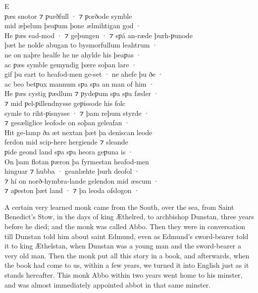\documentclass[10pt]{book}
\begin{document}
\begin{center}
\parbox{9.29cm}{
\lettrine[lines=4]{\color{BrickRed}E}{} \\
ƿ\ae{}s snotor ⁊ ƿurðfull · ⁊ ƿorðode symble\\
mid \ae{}þelum þeaƿum þone \ae{}lmihtigan god · \\
He ƿ\ae{}s ead-mod · ⁊ geþungen · ⁊ sƿ\'a an-r\ae{}de þurh-ƿunode \\
þ\ae{}t he nolde abugan to bysmorfullum leahtrum · \\
ne on naþre healfe he ne ahylde his þeaƿas · \\
ac ƿ\ae{}s symble gemyndig þ\ae{}re soþan lare · \\
gif þu eart to heafod-men ge-set · ne ahefe þu ðe · \\
ac beo betƿux mannum sƿa sƿa an man of him · \\
He ƿ\ae{}s cystig ƿ\ae{}dlum ⁊ ƿydeƿum sƿa sƿa f\ae{}der · \\
⁊ mid ƿel-ƿillendnysse geƿissode his folc \\
symle to riht-ƿisnysse · ⁊ þam reþum styrde · \\
⁊ ges\ae{}liglice leofode on soþan geleafan · \\
Hit ge-lamp ða \ae{}t nextan þ\ae{}t þa deniscan leode \\
ferdon mid scip-here hergiende ⁊ sleande \\
ƿide geond land sƿa sƿa heora geƿuna is · \\
On þam flotan ƿ\ae{}ron þa fyrmestan heafod-men \\
hinguar ⁊ hubba · geanl\ae{}hte þurh deofol · \\
⁊ hí on norð-hymbra-lande gelendon mid \ae{}scum · \\
⁊ aƿeston þ\ae{}t land · ⁊ þa leoda ofslogon · \\
}
\end{center}

\clearpage

\begin{center}
\footnotesize{}
\end{center}

A certain very learned monk came from the South, over the sea, from  Saint Benedict's Stow, in the days of king \AE{}thelred, to archbishop  Dunstan, three years before he died; and the monk was called Abbo. Then they were in  conversation till Dunstan told him about saint Edmund, even as Edmund's sword-bearer told it to king \AE{}thelstan, when  Dunstan was a young man and the sword-bearer a very old man. Then the monk put  all this story in a book, and afterwards,  when the book had come to us, within a few years, we turned it into  English just as it stands hereafter. This monk Abbo within two years went home to his minster, and  was almost immediately appointed abbot in that same minster.\linebreak{}
\end{document}
